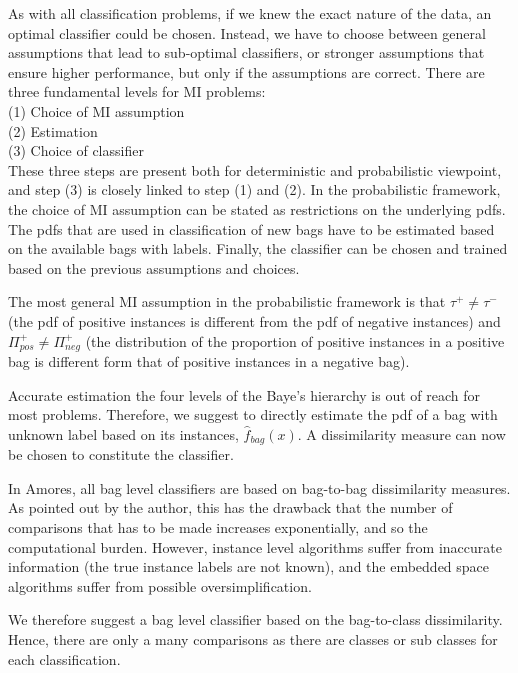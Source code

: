 As with all classification problems, if we knew the exact nature of the data, an optimal classifier could be chosen. 
Instead, we have to choose between general assumptions that lead to sub-optimal classifiers, or stronger assumptions that ensure higher performance, but only if the assumptions are correct. 
There are three fundamental levels for MI problems: \\
(1) Choice of MI assumption \\
(2) Estimation \\
(3) Choice of classifier \\
These three steps are present both for deterministic and probabilistic viewpoint, and step (3) is closely linked to step (1) and (2). 
In the probabilistic framework, the choice of MI assumption can be stated as restrictions on the underlying pdfs. 
The pdfs that are used in classification of new bags have to be estimated based on the available bags with labels. 
Finally, the classifier can be chosen and trained based on the previous assumptions and choices. 

The most general MI assumption in the probabilistic framework is that $\tau^+ \neq \tau^-$ (the pdf of positive instances is different from the pdf of negative instances) and $\Pi_{pos}^+ \neq \Pi_{neg}^+$ (the distribution of the proportion of positive instances in a positive bag is different form that of positive instances in a negative bag). 

Accurate estimation the four levels of the Baye's hierarchy is out of reach for most problems. 
Therefore, we suggest to directly estimate the pdf of a bag with unknown label based on its instances, $\hat{f}_{bag}(x)$.
A dissimilarity measure can now be chosen to constitute the classifier. 

In Amores, all bag level classifiers are based on bag-to-bag dissimilarity measures. 
As pointed out by the author, this has the drawback that the number of comparisons that has to be made increases exponentially, and so the computational burden.
However, instance level algorithms suffer from inaccurate information (the true instance labels are not known), and the embedded space algorithms suffer from possible oversimplification. 

We therefore suggest a bag level classifier based on the bag-to-class dissimilarity. 
Hence, there are only a many comparisons as there are classes or sub classes for each classification. 










